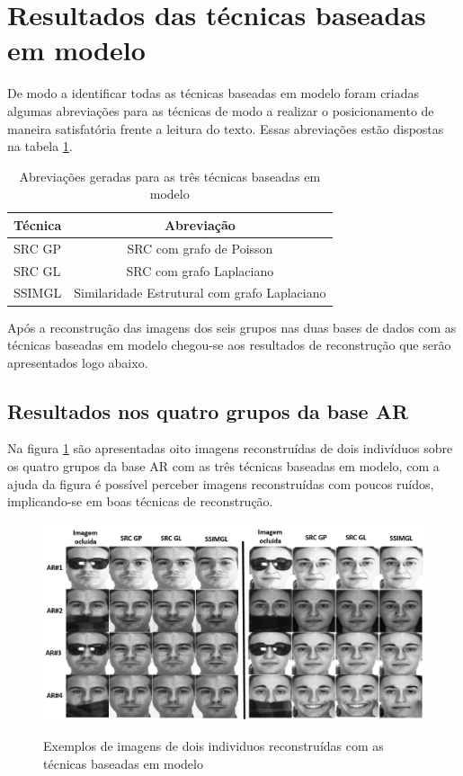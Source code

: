 \section{Resultados das técnicas baseadas em modelo}

De modo a identificar todas as técnicas baseadas em modelo foram criadas algumas abreviações para as técnicas de modo a realizar o posicionamento de maneira satisfatória frente a leitura do texto. Essas abreviações estão dispostas na tabela \ref{tab:tecnicas_modelo}.

\begin{table}[htpb]
	\centering
	\caption{Abreviações geradas para as três técnicas baseadas em modelo}
    \label{tab:tecnicas_modelo}
	\begin{tabular}{|l|c|} \hline

		\textbf{Técnica}	& Abreviação  \\ \hline
		SRC GP  & SRC com grafo de Poisson  \\ \hline
		SRC GL  & SRC com grafo Laplaciano  \\ \hline
		SSIMGL & Similaridade Estrutural com grafo Laplaciano \\ \hline
		 
	\end{tabular}
\end{table}

Após a reconstrução das imagens dos seis grupos nas duas bases de dados com as técnicas baseadas em modelo chegou-se aos resultados de reconstrução que serão apresentados logo abaixo.

\subsection{Resultados nos quatro grupos da base AR}

Na figura \ref{fig:exemplos_rec_modelo} são apresentadas oito imagens reconstruídas de dois indivíduos sobre os quatro grupos da base AR com as três técnicas baseadas em modelo, com a ajuda da figura é possível perceber imagens reconstruídas com poucos ruídos, implicando-se em boas técnicas de reconstrução.

\begin{figure}[H]
\centering
\caption{Exemplos de imagens de dois individuos reconstruídas com as técnicas baseadas em modelo}
\includegraphics[scale=0.55]{imgs4/reconstrucoes_modelo}
\label{fig:exemplos_rec_modelo}
\end{figure}


